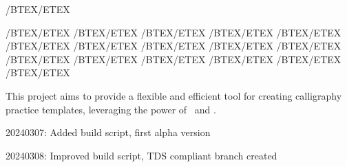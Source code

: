 /BTEX/ETEX

/BTEX\NormalTok{[}/ETEX
/BTEX/ETEX
/BTEX/ETEX
/BTEX/ETEX
/BTEX/ETEX
/BTEX/ETEX
/BTEX/ETEX
/BTEX/ETEX
/BTEX/ETEX
/BTEX/ETEX
/BTEX/ETEX
/BTEX/ETEX
/BTEX/ETEX
/BTEX/ETEX
/BTEX\NormalTok{]}/ETEX
/BTEX/ETEX
\stophighlighting

This project aims to provide a flexible and efficient tool for creating calligraphy practice templates, leveraging the power of \CONTEXT~and \METAPOST.

\stopsubsection

\stopsection

\startsection[title={Changelog},reference={changelog}]

\startitemize[packed]
\item
  20240307: Added build script, first alpha version
\item
  20240308: Improved build script, TDS compliant branch created
\stopitemize

\stopsection

\stopchapter
